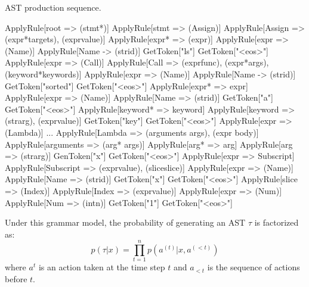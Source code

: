 \begin{codelist}{AST production sequence.}
\begin{verbnobox}[\verbarg]
ApplyRule[root => (stmt*)]
    ApplyRule[stmt => (Assign)]
        ApplyRule[Assign => (expr*{targets}), (expr{value})]
            ApplyRule[expr* => (expr)]
                ApplyRule[expr => (Name)]
                    ApplyRule[Name -> (str{id})]
                        GetToken["ls"]
                        GetToken["<eos>"]
            ApplyRule[expr => (Call)]
                ApplyRule[Call => (expr{func}), (expr*{args}), (keyword*{keywords})]
                    ApplyRule[expr => (Name)]
                        ApplyRule[Name -> (str{id})]
                            GetToken["sorted"]
                            GetToken["<eos>"]
                    ApplyRule[expr* => expr]
                        ApplyRule[expr => (Name)]
                            ApplyRule[Name => (str{id})]
                                GetToken["a"]
                                GetToken["<eos>"]
                    ApplyRule[keyword* => keyword]
                        ApplyRule[keyword => (str{arg}), (expr{value})]
                            GetToken["key"]
                            GetToken["<eos>"]
                            ApplyRule[expr => (Lambda)]
...
ApplyRule[Lambda => (arguments args), (expr body)]
    ApplyRule[arguments => (arg* args)]
        ApplyRule[arg* => arg]
            ApplyRule[arg => (str{arg})]
                GenToken["x"]
                GetToken["<eos>"]
    ApplyRule[expr => Subscript]
        ApplyRule[Subscript => (expr{value}), (slice{slice})]
            ApplyRule[expr => (Name)]
                ApplyRule[Name => (str{id})]
                    GetToken["x"]
                    GetToken["<eos>"]
            ApplyRule[slice => (Index)]
                ApplyRule[Index => (expr{value})]
                    ApplyRule[expr => (Num)]
                        ApplyRule[Num => (int{n})]
                            GetToken["1"]
                            GetToken["<eos>"]
\end{verbnobox}
\label{code:ast_production}
\end{codelist}

Under this grammar model, the probability of generating an AST $\tau$ is factorized as:
\begin{equation}
p(\tau|x) = \prod^{n}_{t=1} p(a^{(t)}|x, a^{(<t)})
\label{eqn:tree_probability}
\end{equation}
where $a^{t}$ is an action taken at the time step $t$ and $a_{<t}$ is the sequence of actions before $t$. 

